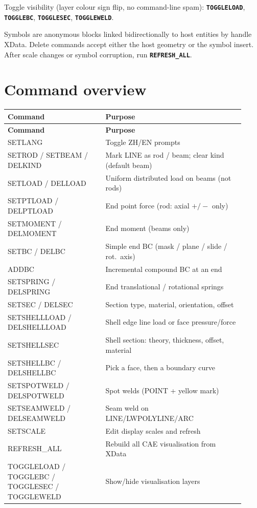 \documentclass[a4paper]{ltxdoc}
\newcommand{\cadcmd}[1]{\texttt{\textbf{#1}}}
\begin{document}
Toggle visibility (layer colour sign flip, no command-line spam):
\cadcmd{TOGGLELOAD}, \cadcmd{TOGGLEBC}, \cadcmd{TOGGLESEC},
\cadcmd{TOGGLEWELD}.

Symbols are anonymous blocks linked bidirectionally to host entities by
handle XData.  Delete commands accept either the host geometry or the
symbol insert.  After scale changes or symbol corruption, run
\cadcmd{REFRESH\_ALL}.

\section{Command overview}

{\small
\begin{longtable}{@{}>{\ttfamily\raggedright\arraybackslash}p{0.38\linewidth}
                  >{\raggedright\arraybackslash}p{0.54\linewidth}@{}}
\toprule
\normalfont\textbf{Command} & \textbf{Purpose} \\
\midrule
\endfirsthead
\toprule
\normalfont\textbf{Command} & \textbf{Purpose} \\
\midrule
\endhead
\bottomrule
\endfoot
SETLANG & Toggle ZH/EN prompts \\
SETROD / SETBEAM / DELKIND
  & Mark LINE as rod / beam; clear kind (default beam) \\
SETLOAD / DELLOAD
  & Uniform distributed load on beams (not rods) \\
SETPTLOAD / DELPTLOAD
  & End point force (rod: axial $+/-$ only) \\
SETMOMENT / DELMOMENT
  & End moment (beams only) \\
SETBC / DELBC
  & Simple end BC (mask / plane / slide / rot.\ axis) \\
ADDBC & Incremental compound BC at an end \\
SETSPRING / DELSPRING
  & End translational / rotational springs \\
SETSEC / DELSEC
  & Section type, material, orientation, offset \\
SETSHELLLOAD / DELSHELLLOAD
  & Shell edge line load or face pressure/force \\
SETSHELLSEC & Shell section: theory, thickness, offset, material \\
SETSHELLBC / DELSHELLBC
  & Pick a face, then a boundary curve \\
SETSPOTWELD / DELSPOTWELD
  & Spot welds (POINT + yellow mark) \\
SETSEAMWELD / DELSEAMWELD
  & Seam weld on LINE/LWPOLYLINE/ARC \\
SETSCALE & Edit display scales and refresh \\
REFRESH\_ALL & Rebuild all CAE visualisation from XData \\
TOGGLELOAD / TOGGLEBC / TOGGLESEC / TOGGLEWELD
  & Show/hide visualisation layers \\
\end{longtable}}
\end{document}
